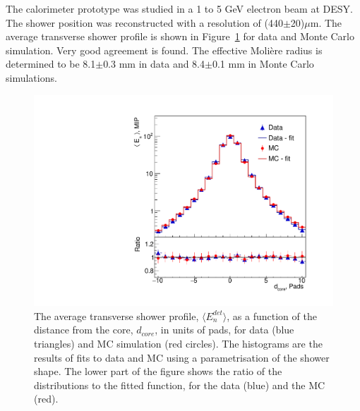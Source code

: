The calorimeter prototype was studied in a 1 to 5 GeV electron beam at DESY. The shower position was reconstructed with a resolution of (440$\pm$20)$\mu$m.
The average transverse shower profile is shown in 
Figure~\ref{MR_5GeV} for data and Monte Carlo simulation. Very good agreement is found. The effective Moli\`ere radius is
determined to be 8.1$\pm$0.3 mm in data and 8.4$\pm$0.1 mm in Monte Carlo simulations.

\begin{figure}[h!]
      \includegraphics[width=\textwidth]{Calorimeter/FCAL/figs/MR_5GeV_EffS_v3.pdf}
    \caption{The average transverse shower profile, $\langle E^{det}_{n} \rangle$, as a function 
of the distance from the core, $d_{core}$, in units of pads, for data (blue triangles) and MC 
simulation (red circles). The histograms are the results of fits to data and MC using a parametrisation of the 
shower shape. The lower part of the figure shows the ratio 
of the distributions to the fitted function, for the data (blue) and the MC (red).   }
    \label{MR_5GeV}
\end{figure}



